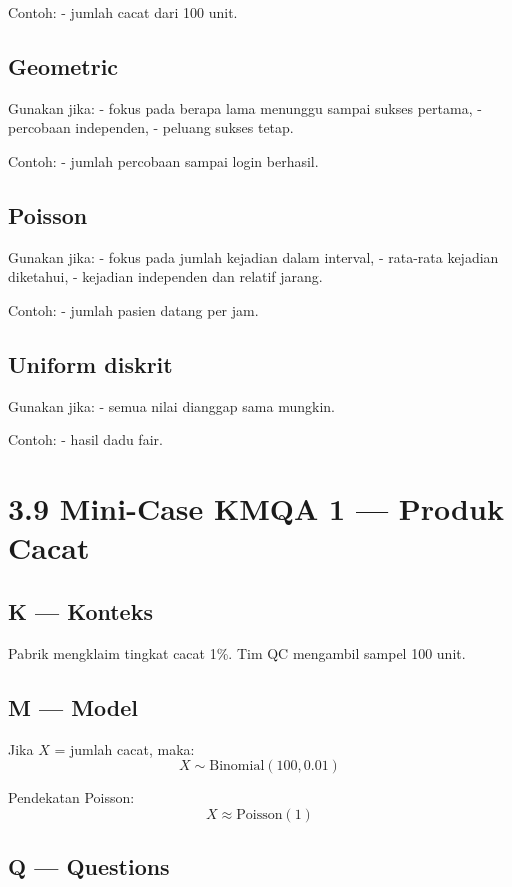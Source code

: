 \documentclass[
  letterpaper,
  DIV=11,
  numbers=noendperiod]{scrreprt}
\begin{document}
Contoh: - jumlah cacat dari 100 unit.

\subsection{Geometric}\label{geometric}

Gunakan jika: - fokus pada berapa lama menunggu sampai sukses pertama, -
percobaan independen, - peluang sukses tetap.

Contoh: - jumlah percobaan sampai login berhasil.

\subsection{Poisson}\label{poisson}

Gunakan jika: - fokus pada jumlah kejadian dalam interval, - rata-rata
kejadian diketahui, - kejadian independen dan relatif jarang.

Contoh: - jumlah pasien datang per jam.

\subsection{Uniform diskrit}\label{uniform-diskrit}

Gunakan jika: - semua nilai dianggap sama mungkin.

Contoh: - hasil dadu fair.

\section{3.9 Mini-Case KMQA 1 --- Produk
Cacat}\label{mini-case-kmqa-1-produk-cacat}

\subsection{K --- Konteks}\label{k-konteks-16}

Pabrik mengklaim tingkat cacat 1\%. Tim QC mengambil sampel 100 unit.

\subsection{M --- Model}\label{m-model-16}

Jika \(X\) = jumlah cacat, maka: \[
X \sim \text{Binomial}(100, 0.01)
\]

Pendekatan Poisson: \[
X \approx \text{Poisson}(1)
\]

\subsection{Q --- Questions}\label{q-questions-16}
\end{document}
